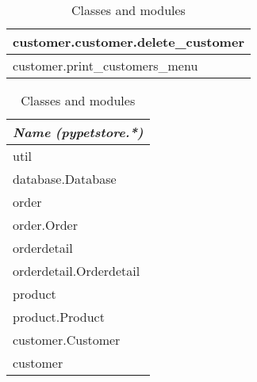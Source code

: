 \begin{table}[h]
\begin{subtable}[h]{0.45\textwidth}
\begin{tabular}{ >{\raggedright\arraybackslash}m{160pt}}
            customer.customer.delete\_customer\\
            \midrule
            customer.print\_customers\_menu\\
            \bottomrule
        \end{tabular} 
        \caption{Functions and classes}
    \end{subtable}
    \begin{subtable}[h]{0.45\textwidth}
        \begin{tabular}{ >{\raggedright\arraybackslash}m{160pt}}
            \toprule
            \textit{Name} \newline \textit{(pypetstore.*)}\\
            \midrule
            util\\
            \midrule
            database.Database\\
            \midrule
            order\\
            \midrule
            order.Order\\
            \midrule
            orderdetail\\
            \midrule
            orderdetail.Orderdetail\\
            \midrule
            product\\
            \midrule
            product.Product\\
            \midrule
            customer.Customer\\
            \midrule
            customer\\
            \bottomrule
        \end{tabular}  
        \caption{Classes and modules}
    \end{subtable}
\end{table}
